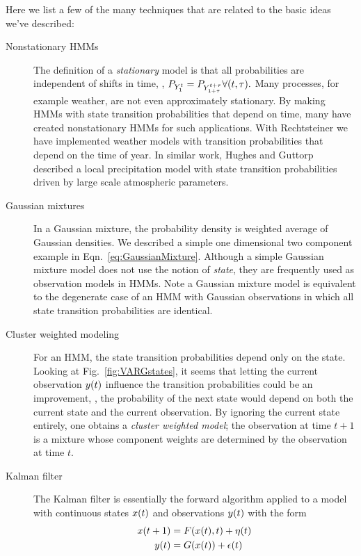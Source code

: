 Here we list a few of the many techniques that are related to the
basic ideas we've described:
\begin{description}
\item[Nonstationary HMMs] The definition of a \emph{stationary} model
  is that all probabilities are independent of shifts in time, \ie, $
  P_{Y_{1}^{t}} = P_{Y_{1+\tau}^{t+\tau}} \forall (t,\tau).$
  Many processes, for example weather, are not even approximately
  stationary.  By making HMMs with state transition probabilities that
  depend on time, many have created nonstationary HMMs for such
  applications.  With Rechtsteiner\cite{Rechtsteiner2000} we have
  implemented weather models with transition probabilities that depend
  on the time of year.  In similar work, Hughes and
  Guttorp\cite{Hughes99} described a local precipitation model with
  state transition probabilities driven by large scale atmospheric
  parameters.
\item[Gaussian mixtures] In a Gaussian mixture, the probability
  density is weighted average of Gaussian densities.  We described a
  simple one dimensional two component example in
  Eqn.~\eqref{eq:GaussianMixture}.  Although a simple Gaussian mixture
  model does not use the notion of \emph{state}, they are frequently
  used as observation models in HMMs.  Note a Gaussian mixture model
  is equivalent to the degenerate case of an HMM with Gaussian
  observations in which all state transition probabilities are
  identical.
\item[Cluster weighted modeling] For an HMM, the state transition
  probabilities depend only on the state.  Looking at
  Fig.~\ref{fig:VARGstates}, it seems that letting the current
  observation ${y}{(t)}$ influence the transition probabilities could
  be an improvement, \ie, the probability of the next state would
  depend on both the current state and the current observation.  By
  ignoring the current state entirely, one obtains a \emph{ cluster
    weighted model}\cite{Gershenfeld99}; the observation at time $t+1$
  is a mixture whose component weights are determined by the
  observation at time $t$.
\item[Kalman filter] The Kalman filter is essentially the forward
  algorithm applied to a model with continuous states ${x}{(t)}$ and
  observations ${y}{(t)}$ with the form
  \begin{align*}
    {x}{(t+1)} &= F({x}{(t)},t) + {\eta}{(t)}\\
    {y}{(t)} &= G({x}{(t)}) + {\epsilon}{(t)}
  \end{align*}

\end{description}
